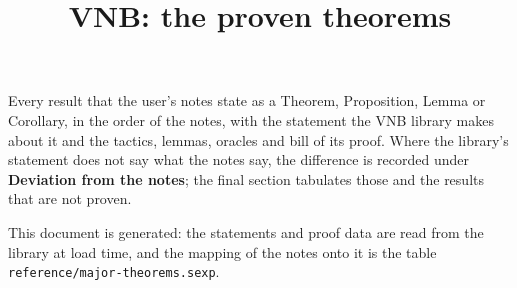 \documentclass[11pt]{article}
\title{VNB: the proven theorems}
\author{}
\date{}
\begin{document}
\maketitle

\noindent
Every result that the user's notes state as a Theorem, Proposition, Lemma or
Corollary, in the order of the notes, with the statement the VNB library makes
about it and the tactics, lemmas, oracles and bill of its proof.  Where the
library's statement does not say what the notes say, the difference is recorded
under \textbf{Deviation from the notes}; the final section tabulates those and
the results that are not proven.

\medskip
\noindent
This document is generated: the statements and proof data are read from the
library at load time, and the mapping of the notes onto it is the table
\texttt{reference/major-theorems.sexp}.

\tableofcontents


\end{document}
